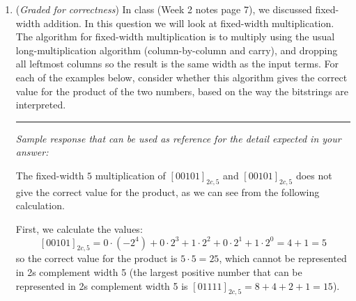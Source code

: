 \documentclass[12pt, oneside]{article}
\begin{document}
\begin{enumerate}
\begin{enumerate}
    Pro tip: To show a color, you can use the following LaTeX source code:
    
        \verb|\definecolor{UCSDaccent}{RGB}{0,198,215}|

        \verb|\textcolor{UCSDaccent}{\rule{1cm}{1cm}}|

    which produces 
    \textcolor{UCSDaccent}{\rule{1cm}{1cm}}

    Notice that the code to define the color uses the decimal-like values 
    for each of the red, green, and blue components. For the UCSD accent color we defined, 
    the base $16$ fixed-width $2$ values are: red is $(00)_{16,2}$, green is $(C6)_{16,2}$,
    blue is $(D7)_{16,2}$.

    {\it Extra; not for credit:} What does this mean about the choice of hex color for
    representing colors? What are advantages and disadvantages of this representation?

    \end{enumerate}

    \item ({\it Graded for correctness}) In class (Week 2 notes page 7), we discussed fixed-width addition. In this
    question we will look at fixed-width multiplication. The algorithm for fixed-width 
    multiplication is to multiply using the usual long-multiplication algorithm 
    (column-by-column and carry), and dropping all leftmost columns so the result is the same 
    width as the input terms. For each of the examples below, consider whether 
    this algorithm gives the correct value for the product of the two numbers, based on
    the way the bitstrings are interpreted.

    \rule{0.5\textwidth}{.4pt}

    {\it Sample response that can be used as reference for the detail expected 
    in your answer:} 
    
    The fixed-width $5$ multiplication of $[00101]_{2c,5}$ and $[00101]_{2c,5}$ 
    does not give the correct
    value for the product, as we can see from the following calculation.
    
    First, we calculate the values: 
    \[
        [00101]_{2c,5} = 0\cdot (-2^4) + 0\cdot 2^3 + 1 \cdot 2^2 + 0\cdot 2^1 + 1 \cdot 2^0 = 4 + 1 = 5
    \]
    so the correct value for the product is $5 \cdot 5 = 25$, which cannot be represented
    in 2s complement width 5 (the largest positive number that can be represented in 
    2s complement width 5 is $[01111]_{2c,5} = 8 + 4 + 2 + 1 = 15$).
    

\end{enumerate}
\end{document}
